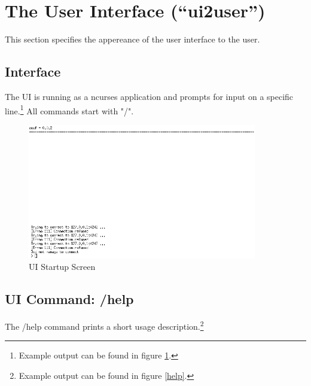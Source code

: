 \section{The User Interface ("`ui2user"')}
This section specifies the appereance of the user interface to the user.

\subsection{Interface}
The UI is running as a ncurses application and prompts for input
on a specific line.\footnote{Example output can be found in figure \ref{startup}.}
All commands start with "/".
\begin{figure}
    \caption{UI Startup Screen}
    \label{startup}
    \centering
    \includegraphics[width=10cm]{ui-startup.png}
\end{figure}

\subsection{UI Command: /help}
The /help command prints a short usage
description.\footnote{Example output can be found in figure \ref{help}.}

